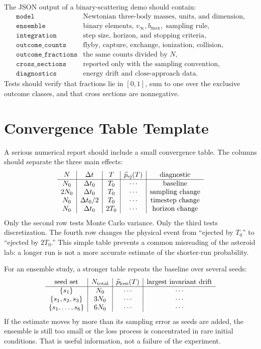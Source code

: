 The JSON output of a binary-scattering demo should contain:
\[
\begin{array}{ll}
\texttt{model} & \text{Newtonian three-body masses, units, and dimension},\\
\texttt{ensemble} & \text{binary elements, }v_\infty,b_{\max},
  \text{ sampling rule},\\
\texttt{integration} & \text{step size, horizon, and stopping criteria},\\
\texttt{outcome\_counts} & \text{flyby, capture, exchange, ionization,
  collision},\\
\texttt{outcome\_fractions} & \text{the same counts divided by }N,\\
\texttt{cross\_sections} & \text{reported only with the sampling convention},\\
\texttt{diagnostics} & \text{energy drift and close-approach data}.
\end{array}
\]
Tests should verify that fractions lie in \([0,1]\), sum to one over the
exclusive outcome classes, and that cross sections are nonnegative.

\section{Convergence Table Template}
\label{sec:three-body-convergence-template}

A serious numerical report should include a small convergence table.  The
columns should separate the three main effects:
\[
\begin{array}{c|c|c|c|c}
N & \Delta t & T & \widehat p_{\rm ej}(T) &
\text{diagnostic}\\
\hline
N_0 & \Delta t_0 & T_0 & \cdots & \text{baseline}\\
2N_0 & \Delta t_0 & T_0 & \cdots & \text{sampling change}\\
N_0 & \Delta t_0/2 & T_0 & \cdots & \text{timestep change}\\
N_0 & \Delta t_0 & 2T_0 & \cdots & \text{horizon change}
\end{array}
\]
Only the second row tests Monte Carlo variance.  Only the third tests
discretization.  The fourth row changes the physical event from ``ejected by
\(T_0\)'' to ``ejected by \(2T_0\).''  This simple table prevents a common
misreading of the asteroid lab: a longer run is not a more accurate estimate
of the shorter-run probability.

For an ensemble study, a stronger table repeats the baseline over several
seeds:
\[
\begin{array}{c|c|c|c}
\text{seed set} & N_{\rm total} & \widehat p_{\rm loss}(T) &
\text{largest invariant drift}\\
\hline
\{s_1\} & N_0 & \cdots & \cdots\\
\{s_1,s_2,s_3\} & 3N_0 & \cdots & \cdots\\
\{s_1,\ldots,s_6\} & 6N_0 & \cdots & \cdots
\end{array}
\]
If the estimate moves by more than its sampling error as seeds are added, the
ensemble is still too small or the loss process is concentrated in rare
initial conditions.  That is useful information, not a failure of the
experiment.

